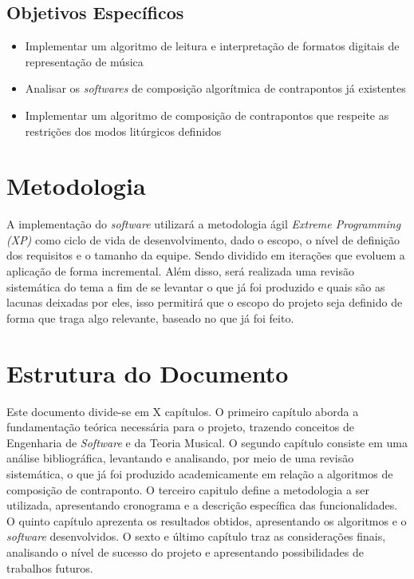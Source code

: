 \subsection{Objetivos Específicos}

\begin{itemize}
\item Implementar um algoritmo de leitura e interpretação de formatos digitais de representação de música
\item Analisar os \textit{softwares} de composição algorítmica de contrapontos já existentes
\item Implementar um algoritmo de composição de contrapontos que respeite as restrições dos modos litúrgicos definidos
\end{itemize}

\section{Metodologia}

A implementação do \textit{software} utilizará a metodologia ágil \textit{Extreme Programming (XP)} como ciclo de vida de desenvolvimento, dado o escopo, o nível de definição dos requisitos e o tamanho da equipe. Sendo dividido em iterações que evoluem a aplicação de forma incremental. Além disso, será realizada uma revisão sistemática do tema a fim de se levantar o que já foi produzido e quais são as lacunas deixadas por eles, isso permitirá que o escopo do projeto seja definido de forma que traga algo relevante, baseado no que já foi feito.

\section{Estrutura do Documento}

Este documento divide-se em X capítulos. O primeiro capítulo aborda a fundamentação teórica necessária para o projeto, trazendo conceitos de Engenharia de \textit{Software} e da Teoria Musical. O segundo capítulo consiste em uma análise bibliográfica, levantando e analisando, por meio de uma revisão sistemática, o que já foi produzido academicamente em relação a algoritmos de composição de contraponto. O terceiro capitulo define a metodologia a ser utilizada, apresentando cronograma e a descrição específica das funcionalidades. O quinto capítulo aprezenta os resultados obtidos, apresentando os algoritmos e o \textit{software} desenvolvidos. O sexto e último capítulo traz as considerações finais, analisando o nível de sucesso do projeto e apresentando possibilidades de trabalhos futuros.
